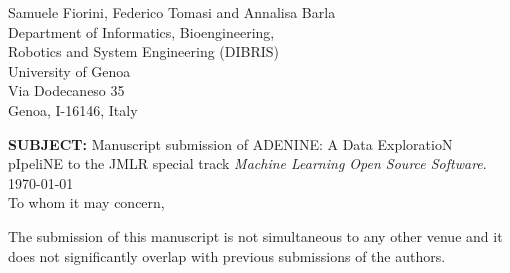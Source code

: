 \documentclass[11pt]{letter} %
\begin{document}

\begin{letter}

\begin{center}
\large Samuele Fiorini, Federico Tomasi and Annalisa Barla \\ %
\vspace{10pt} %
Department of Informatics, Bioengineering, \\Robotics and System Engineering (DIBRIS)\\
University of Genoa\\
Via Dodecaneso 35\\
Genoa, I-16146, Italy
\end{center}
\vfill

\signature{Samuele Fiorini\\Federico Tomasi\\Annalisa Barla} %


{\bf SUBJECT:} Manuscript submission of {\sc ADENINE: A Data ExploratioN pIpeliNE} to the JMLR special track \emph{Machine Learning Open Source Software}.\vspace{10pt}\\
\vspace{10pt}\today\\
\vspace{10pt}
To whom it may concern,

The submission of this manuscript is not simultaneous to any other venue and it does not significantly overlap with previous submissions of the authors.


\end{letter}
\end{document}
